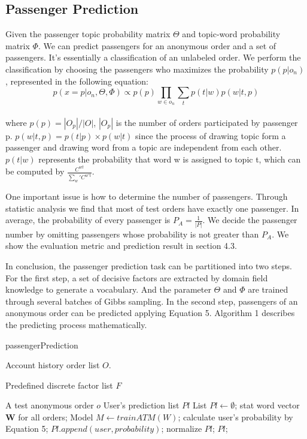 \documentclass{sig-alternate-05-2015}
\begin{document}
\subsection{Passenger Prediction}
Given the passenger topic probability matrix $\Theta$ and topic-word probability matrix $\Phi$. We can predict passengers for an anonymous order and a set of passengers. It's essentially a classification of an unlabeled order\cite{shanshan:unpopular}. We perform the classification by choosing the passengers who maximizes the probability $p(p|o_n)$, represented in the following equation:\\
\begin{equation}
p(x=p|o_n,\Theta,\Phi) \propto p(p)\prod_{w \in o_n}\sum_t p(t|w)p(w|t,p)
\end{equation}\\
where $p(p) = |O_p| / |O|$, $|O_p|$ is the number of orders participated by passenger p. $p(w|t,p) = p(t|p) \times p(w|t)$ since the process of drawing topic form a passenger and drawing word from a topic are independent from each other. $p(t|w)$ represents the probability that word w is assigned to topic t, which can be computed by $\frac{C^{wt}}{\sum_w'C^{w't}}$.\par
One important issue is how to determine the number of passengers. Through statistic analysis we find that most of test orders have exactly one passenger. In average, the probability of every passenger is $P_A = \frac{1}{|P|}$. We decide the passenger number by omitting passengers whose probability is not greater than $P_A$. We show the evaluation metric and prediction result in section 4.3.\par
In conclusion, the passenger prediction task can be partitioned into two steps. For the first step, a set of decisive factors are extracted by domain field knowledge to generate a vocabulary. And the parameter $\Theta$ and $\Phi$ are trained through several batches of Gibbs sampling. In the second step, passengers of an anonymous order can be predicted applying Equation 5. Algorithm 1 describes the predicting process mathematically.\par

\begin{algorithm}[htb]
\caption{passengerPrediction}
\label{alg0}
\begin{algorithmic}[1]
\REQUIRE
Account history order list $O$. \par
Predefined discrete factor list $F$ \par
A test anonymous order $o$
\ENSURE 
User's prediction list $Pl$
\STATE List $Pl \leftarrow \emptyset$;
\STATE stat word vector $\mathbf{W}$ for all orders;
\STATE Model $M \leftarrow trainATM(W)$;
\STATE calculate user's probability by Equation 5;
\STATE $Pl.append(user,probability)$;
\ENDIF
\ENDFOR
\STATE normalize $Pl$;
\RETURN $Pl$;
\end{algorithmic} 
\end{algorithm}
\end{document}
